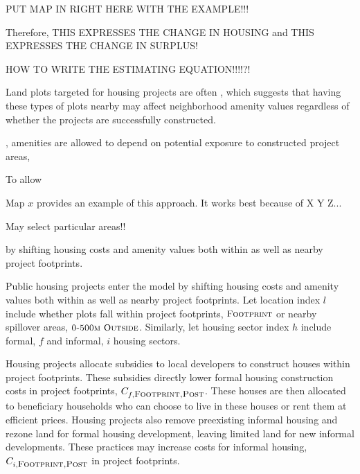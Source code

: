 \documentclass[12pt]{article}
\begin{document}





PUT MAP IN RIGHT HERE WITH THE EXAMPLE!!!


Therefore, THIS EXPRESSES THE CHANGE IN HOUSING  and  THIS EXPRESSES THE CHANGE IN SURPLUS!


HOW TO WRITE THE ESTIMATING EQUATION!!!!?!

Land plots targeted for housing projects are often , which suggests that having these types of plots nearby may affect neighborhood amenity values regardless of whether the projects are successfully constructed.

, amenities are allowed to depend on potential exposure to constructed project areas, 






To allow 

Map $x$ provides an example of this approach.  It works best because of X Y Z...  

May select particular areas!! 





by shifting housing costs and amenity values both within as well as nearby project footprints. 


Public housing projects enter the model by shifting housing costs and amenity values both within as well as nearby project footprints.  Let location index $l$ include whether plots fall within project footprints, $\textsc{\small Footprint}$ or nearby spillover areas, $\textsc{\small 0-500m Outside}$.  Similarly, let housing sector index $h$ include formal, $f$ and informal, $i$ housing sectors.

Housing projects allocate subsidies to local developers to construct houses within project footprints.  These subsidies directly lower formal housing construction costs in project footprints, $C_{f,\textsc{\small Footprint,Post}}$.  These houses are then allocated to beneficiary households who can choose to live in these houses or rent them at efficient prices.  Housing projects also remove preexisting informal housing and rezone land for formal housing development, leaving limited land for new informal developments.  These practices may increase costs for informal housing, $C_{i,\textsc{\small Footprint,Post}}$ in project footprints.
\end{document}
